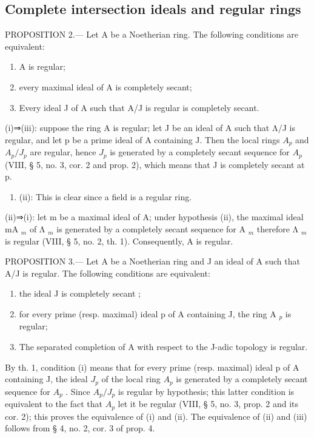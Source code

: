 \subsection{Complete intersection ideals and regular rings}

PROPOSITION 2.--- Let A be a Noetherian ring. The following conditions are equivalent:

\begin{enumerate}
\def\labelenumi{(\roman{enumi})}
\item
  A is regular;
\item
  every maximal ideal of A is completely secant;
\item
  Every ideal J of A such that A/J is regular is completely secant.
\end{enumerate}

(i)⇒(iii): suppose the ring A is regular; let J be an ideal of A such that Λ/J is regular, and let p be a prime ideal of A containing J. Then the local rings \(A_{p}\) and \(A_{p}/J_{p}\) are regular, hence \(J_{p}\) is generated by a completely secant sequence for \(A_{p}\) (VIII, § 5, no. 3, cor. 2 and prop. 2), which means that J is completely secant at p.

\begin{enumerate}
\def\labelenumi{(\roman{enumi})}
\setcounter{enumi}{2}
\tightlist
\item
  (ii): This is clear since a field is a regular ring.
\end{enumerate}

(ii)⇒(i): let m be a maximal ideal of A; under hypothesis (ii), the maximal ideal mA \(_{m}\) of Λ \(_{m}\) is generated by a completely secant sequence for A \(_{m}\) therefore Λ \(_{m}\) is regular (VIII, § 5, no. 2, th. 1). Consequently, A is regular.

PROPOSITION 3.--- Let A be a Noetherian ring and J an ideal of A such that A/J is regular. The following conditions are equivalent:

\begin{enumerate}
\def\labelenumi{(\roman{enumi})}
\item
  the ideal J is completely secant ;
\item
  for every prime (resp. maximal) ideal p of A containing J, the ring A \(_{p}\) is regular;
\item
  The separated completion of A with respect to the J-adic topology is regular.
\end{enumerate}

By th. 1, condition (i) means that for every prime (resp. maximal) ideal p of A containing J, the ideal \(J_{p}\) of the local ring \(A_{p}\) is generated by a completely secant sequence for \(A_{p}\) . Since \(A_{p}/J_{p}\) is regular by hypothesis; this latter condition is equivalent to the fact that \(A_{p}\) let it be regular (VIII, § 5, no. 3, prop. 2 and its cor. 2); this proves the equivalence of (i) and (ii). The equivalence of (ii) and (iii) follows from § 4, no. 2, cor. 3 of prop. 4.

